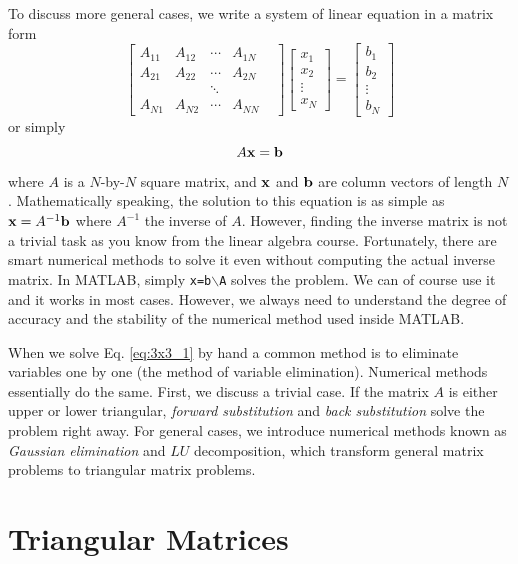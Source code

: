 To discuss more general cases, we write a system of linear equation in a matrix form
\begin{equation}
\begin{bmatrix}\label{eq:NbyN}
A_{11} & A_{12} & \cdots & A_{1N}\\
A_{21} & A_{22} & \cdots & A_{2N}\\
 &  &  \ddots & & \\
A_{N1} & A_{N2} & \cdots & A_{NN}
\end{bmatrix}
\begin{bmatrix}
 x_1 \\
 x_2 \\
 \vdots\\
 x_N
\end{bmatrix}
=
\begin{bmatrix}
 b_1 \\
 b_2 \\
 \vdots\\
 b_N
\end{bmatrix}
\end{equation}
or simply
\begin{equation}\label{eq:lin_sys}
A \vb{x} = \vb{b}
\end{equation}
where $A$ is a $N$-by-$N$ square matrix, and $\vb{x}$ and $\vb{b}$ are column vectors of length $N$.  Mathematically speaking,
the solution to this equation is as simple as $\vb{x} = A^{-1} \vb{b}$ where $A^{-1}$ the inverse of $A$.  However, finding the inverse matrix is not a trivial task as you know from the linear algebra course. Fortunately, there are smart numerical methods to solve it even without computing the actual inverse matrix. In MATLAB, simply \texttt{x=b$\backslash$A} solves the problem. We can of course use it and it works in most cases.  However, we always need to understand the degree of accuracy and the stability of the numerical method used inside MATLAB. 

When we solve Eq. \eqref{eq:3x3_1} by hand a common method is to eliminate variables one by one (the method of variable elimination).  Numerical methods essentially do the same. 
First, we discuss a trivial case. If the matrix $A$ is either upper or lower triangular, \emph{forward substitution} and \emph{back substitution} solve the problem right away.  For general cases, we introduce numerical methods known as \emph{Gaussian elimination} and $LU$ decomposition, which transform general matrix problems to triangular matrix problems.

\noindent
\section{Triangular Matrices}

